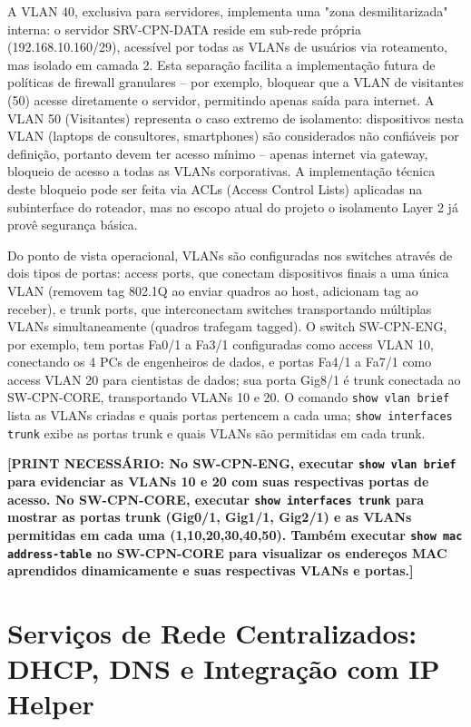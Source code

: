 \documentclass[12pt,a4paper]{article}
\begin{document}
A VLAN 40, exclusiva para servidores, implementa uma "zona desmilitarizada" interna: o servidor SRV-CPN-DATA reside em sub-rede própria (192.168.10.160/29), acessível por todas as VLANs de usuários via roteamento, mas isolado em camada 2. Esta separação facilita a implementação futura de políticas de firewall granulares -- por exemplo, bloquear que a VLAN de visitantes (50) acesse diretamente o servidor, permitindo apenas saída para internet. A VLAN 50 (Visitantes) representa o caso extremo de isolamento: dispositivos nesta VLAN (laptops de consultores, smartphones) são considerados não confiáveis por definição, portanto devem ter acesso mínimo -- apenas internet via gateway, bloqueio de acesso a todas as VLANs corporativas. A implementação técnica deste bloqueio pode ser feita via ACLs (Access Control Lists) aplicadas na subinterface do roteador, mas no escopo atual do projeto o isolamento Layer 2 já provê segurança básica.

Do ponto de vista operacional, VLANs são configuradas nos switches através de dois tipos de portas: access ports, que conectam dispositivos finais a uma única VLAN (removem tag 802.1Q ao enviar quadros ao host, adicionam tag ao receber), e trunk ports, que interconectam switches transportando múltiplas VLANs simultaneamente (quadros trafegam tagged). O switch SW-CPN-ENG, por exemplo, tem portas Fa0/1 a Fa3/1 configuradas como access VLAN 10, conectando os 4 PCs de engenheiros de dados, e portas Fa4/1 a Fa7/1 como access VLAN 20 para cientistas de dados; sua porta Gig8/1 é trunk conectada ao SW-CPN-CORE, transportando VLANs 10 e 20. O comando \texttt{show vlan brief} lista as VLANs criadas e quais portas pertencem a cada uma; \texttt{show interfaces trunk} exibe as portas trunk e quais VLANs são permitidas em cada trunk.

\textbf{[PRINT NECESSÁRIO: No SW-CPN-ENG, executar \texttt{show vlan brief} para evidenciar as VLANs 10 e 20 com suas respectivas portas de acesso. No SW-CPN-CORE, executar \texttt{show interfaces trunk} para mostrar as portas trunk (Gig0/1, Gig1/1, Gig2/1) e as VLANs permitidas em cada uma (1,10,20,30,40,50). Também executar \texttt{show mac address-table} no SW-CPN-CORE para visualizar os endereços MAC aprendidos dinamicamente e suas respectivas VLANs e portas.]}

\section{Serviços de Rede Centralizados: DHCP, DNS e Integração com IP Helper}
\end{document}
